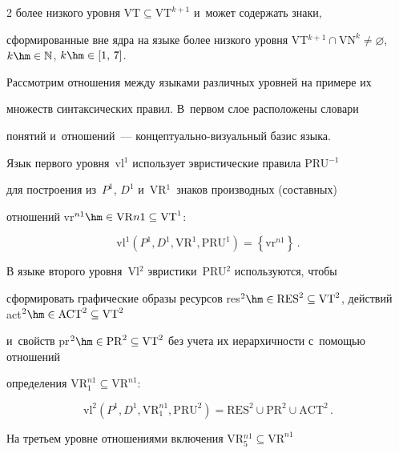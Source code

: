 \begin{multicols}{2}
более низкого уровня $\mathrm{VT}\subseteq \mathrm{VT}^{k+1}$ и~может содержать знаки, 


сформированные вне ядра на языке более низкого уровня VT$^{k+1}\cap 


\mathrm{VN}^k\not= \varnothing$, $k\hm\in \mathbb{N}$, $k\hm\in [1,\,7]$.


  


  Рассмотрим отношения между языками различных уровней на примере их 


множеств синтаксических правил. В~первом слое расположены словари 


понятий и~отношений~--- кон\-цеп\-ту\-аль\-но-ви\-зу\-аль\-ный базис языка. 


Язык первого уровня~vl$^1$ использует эвристические правила PRU$^{-1}$ 


для построения из~$P^1$, $D^1$ и~VR$^1$~знаков производных (составных) 


отношений vr$^{n1}\hm\in \mathrm{VR}{n1}\subseteq \mathrm{VT}^1$:


  $$


  \mathrm{vl}^1\left(P^1, D^1, \mathrm{VR}^1, \mathrm{PRU}^1\right) = 


  \left\{ \mathrm{vr}^{n1}\right\}\,.


  $$


  


  В языке второго уровня~Vl$^2$ эвристики~PRU$^2$ используются, чтобы 


сформировать графические образы ресурсов res$^2\hm\in \mathrm{RES}^2\subseteq 


\mathrm{VT}^2$, действий act$^2\hm\in \mathrm{ACT}^2\subseteq \mathrm{VT}^2$ 


и~свойств pr$^2\hm\in 


\mathrm{PR}^2\subseteq \mathrm{VT}^2$ без учета их иерархичности с~помощью отношений 


определения $\mathrm{VR}_1^{n1}\subseteq \mathrm{VR}^{n1}$:


  $$


  \mathrm{vl}^2\!\left( P^1, D^1, \mathrm{VR}_1^{n1}, 


  \mathrm{PRU}^2\right) =\mathrm{RES}^2\cup \mathrm{PR}^2\cup \mathrm{ACT}^2\,.


  $$


  


  На третьем уровне отношениями включения VR$_5^{n1}\subseteq \mathrm{VR}^{n1}$ 



\end{multicols}
